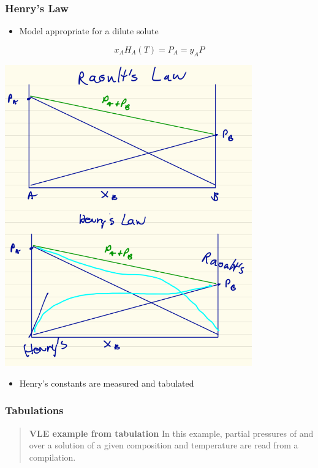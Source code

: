 \documentclass[11pt]{article}
\begin{document}
\subsubsection{Henry's Law}
\label{sec-8-4-2}
\begin{itemize}
\item Model appropriate for a dilute solute
\end{itemize}

\[ x_{A} H_{A}(T) = P_{A} = y_{A} P \]

\includegraphics[width=0.8\textwidth]{./figs/Henry.png}

\begin{itemize}
\item Henry's constants are measured and tabulated
\end{itemize}

\subsubsection{Tabulations}
\label{sec-8-4-3}

\begin{quote}
\hline
\textbf{VLE example from tabulation} In this example, partial pressures of  and  over a solution of a given composition and temperature are read from a compilation.
\hline
\end{quote}
\end{document}
